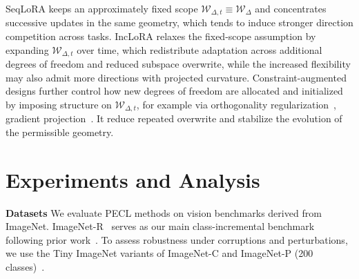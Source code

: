 \documentclass{article}
\theoremstyle{plain}
\theoremstyle{definition}
\theoremstyle{remark}
\begin{document}
SeqLoRA keeps an approximately fixed scope $\mathcal W_{\Delta,t}\equiv\mathcal W_\Delta$ and concentrates successive updates in the same geometry, which tends to induce stronger direction competition across tasks.
IncLoRA relaxes the fixed-scope assumption by expanding $\mathcal W_{\Delta,t}$ over time, which redistribute adaptation across additional degrees of freedom and reduced subspace overwrite, while the increased flexibility may also admit more directions with projected curvature.
Constraint-augmented designs further control how new degrees of freedom are allocated and initialized by imposing structure on $\mathcal W_{\Delta,t}$, for example via orthogonality regularization~\cite{wang2023orthogonal}, gradient projection~\citep{liangInfLoRAInterferenceFreeLowRank2024a,yang2024parametercollisionhinderingcontinual}.
It reduce repeated overwrite and stabilize the evolution of the permissible geometry.





\section{Experiments and Analysis}




\noindent\textbf{Datasets}\quad
We evaluate PECL methods on vision benchmarks derived from ImageNet. ImageNet-R~\cite{ImagenetR_Hendrycks_2021_ICCV} serves as our main class-incremental benchmark following prior work~\cite{liangInfLoRAInterferenceFreeLowRank2024a}.
To assess robustness under corruptions and perturbations, we use the Tiny ImageNet variants of ImageNet-C and ImageNet-P (200 classes)~\cite{hendrycks2018benchmarking}.
\end{document}
